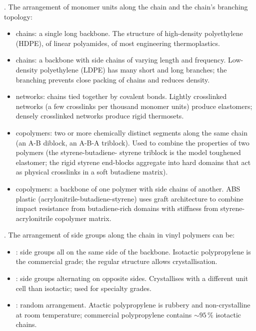 . The arrangement of monomer units along
the chain and the chain's branching topology:

\begin{itemize}[leftmargin=*]
\item {} chains: a single long backbone. The structure
  of high-density polyethylene (HDPE), of linear polyamides, of
  most engineering thermoplastics.
\item {} chains: a backbone with side chains of
  varying length and frequency. Low-density polyethylene (LDPE)
  has many short and long branches; the branching prevents close
  packing of chains and reduces density.
\item {} networks: chains tied together by covalent
  bonds. Lightly crosslinked networks (a few crosslinks per thousand
  monomer units) produce elastomers; densely crosslinked networks
  produce rigid thermosets.
\item {} copolymers: two or more chemically distinct
  segments along the same chain (an A-B diblock, an A-B-A triblock).
  Used to combine the properties of two polymers (the styrene-butadiene-
  styrene triblock is the model toughened elastomer; the rigid
  styrene end-blocks aggregate into hard domains that act as physical
  crosslinks in a soft butadiene matrix).
\item {} copolymers: a backbone of one polymer with side
  chains of another. ABS plastic (acrylonitrile-butadiene-styrene)
  uses graft architecture to combine impact resistance from
  butadiene-rich domains with stiffness from styrene-acrylonitrile
  copolymer matrix.
\end{itemize}

. The arrangement of side groups
along the chain in vinyl polymers can be:

\begin{itemize}[leftmargin=*]
\item {}: side groups all on the same side of the
  backbone. Isotactic polypropylene is the commercial grade; the
  regular structure allows crystallisation.
\item {}: side groups alternating on opposite
  sides. Crystallises with a different unit cell than isotactic;
  used for specialty grades.
\item {}: random arrangement. Atactic polypropylene
  is rubbery and non-crystalline at room temperature; commercial
  polypropylene contains $\sim 95\,\%$ isotactic chains.
\end{itemize}

